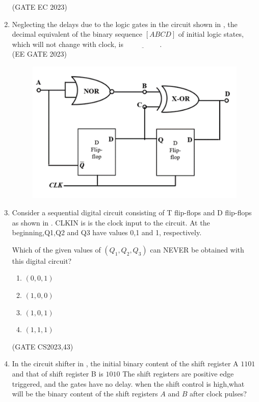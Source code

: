 \begin{enumerate}[label=\arabic*.,ref=\theenumi]
\begin{figure}[H]
{
	}
    \caption{}
	\label{fig:GATE EC 2023}
\end{figure}
\hfill(GATE EC 2023)
%
\item Neglecting the delays due to the logic gates in the circuit shown in 
,
 the 
decimal equivalent of the binary sequence $[ABCD]$ of initial logic states, which will not change with clock, is $\underline{\hspace{2cm}}$.\\

\hfill{(EE GATE 2023)}\\

\begin{figure}[H]
 \centering
\includegraphics[width=0.75\columnwidth]{ide/7474/figs/Gate_question.png}
\caption{}
\label{fig:Gate_question.png}
\end{figure}

\item 
Consider a sequential digital circuit consisting of T flip-flops and D flip-flops as shown in 
.
 CLKIN is is the clock input to the circuit. At the beginning,Q1,Q2 and Q3 have values 0,1 and 1, respectively.
%
	\begin{figure}[H]
    \centering
    \resizebox{0.75\columnwidth}{!}{%

		}
\caption{}
\label{fig:Flip-Flop}
\end{figure}
Which of the given values of \((Q_1, Q_2, Q_3)\) can NEVER be obtained with this digital circuit?
\begin{enumerate}
    
    \item ${(0,0,1)}$
    \item ${(1,0,0)}$
    \item ${(1,0,1)}$
    \item ${(1,1,1)}$
\end{enumerate}
\hfill(GATE CS2023,43)
\item In the circuit shifter in 
,
the initial binary content of the shift register A $1101$ and that of shift register B is $1010$ The shift registers are positive edge triggered, and the gates have no delay.
when the shift control is high,what will be the binary content of the shift registers $A$ and $B$ after clock pulses?


\end{enumerate}
